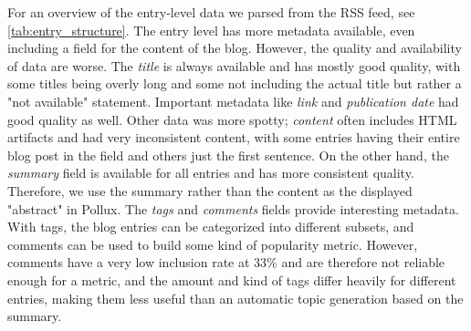 \documentclass{article}
\begin{document}
For an overview of the entry-level data we parsed from the RSS feed, see \autoref{tab:entry_structure}. The entry level has more metadata available, even including a field for the content of the blog. However, the quality and availability of data are worse. The \textit{title} is always available and has mostly good quality, with some titles being overly long and some not including the actual title but rather a "not available" statement. Important metadata like \textit{link} and \textit{publication date} had good quality as well. Other data was more spotty; \textit{content} often includes HTML artifacts and had very inconsistent content, with some entries having their entire blog post in the field and others just the first sentence. On the other hand, the \textit{summary} field is available for all entries and has more consistent quality. Therefore, we use the summary rather than the content as the displayed "abstract" in Pollux. The \textit{tags} and \textit{comments} fields provide interesting metadata. With tags, the blog entries can be categorized into different subsets, and comments can be used to build some kind of popularity metric. However, comments have a very low inclusion rate at 33\% and are therefore not reliable enough for a metric, and the amount and kind of tags differ heavily for different entries, making them less useful than an automatic topic generation based on the summary.
\end{document}
